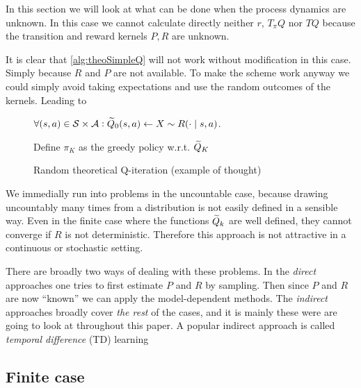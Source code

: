 
In this section we will look at what can be done when the process dynamics
are unknown.
In this case we cannot calculate directly neither $r$, $T_\pi Q$ nor
$TQ$ because the transition and reward kernels $P,R$ are unknown.

It is clear that \cref{alg:theoSimpleQ} will not work without
modification in this case. Simply because $R$ and $P$ are not
available.
To make the scheme work anyway we could simply avoid taking expectations
and use the random outcomes of the kernels.
Leading to

\begin{figure}[H]
\begin{algorithm}[H] %
  \caption{Random theoretical Q-iteration (example of thought)}
$\forall (s, a) \in \mathcal{S} \times \mathcal{A} :
\widetilde{Q}_0(s, a) \leftarrow X \sim R(\cdot \mid s, a)$.

Define $\pi_K$ as the greedy policy w.r.t. $\widetilde{Q}_K$ \\
\label{alg:theoRandomQ}
\end{algorithm}
\end{figure}
We immedially run into problems in the uncountable case, because
drawing uncountably many times from a distribution is not easily
defined in a sensible way.
Even in the finite case where the functions $\widetilde{Q}_k$
are well defined, they cannot converge if $R$ is not deterministic.
Therefore this approach is not attractive in a continuous or
stochastic setting.

There are broadly two ways of dealing with these problems.
In the \emph{direct} approaches one tries to first estimate $P$ and $R$
by sampling.
Then since $P$ and $R$ are now ``known'' we can apply the model-dependent
methods.
The \emph{indirect} approaches broadly cover \emph{the rest} of the 
cases, and it is mainly these were are going to look at throughout this
paper. A popular indirect approach is called
\emph{temporal difference} (TD) learning 

\subsection{Finite case}

